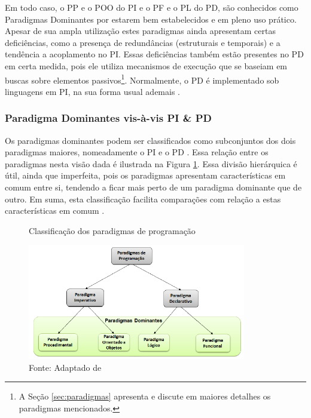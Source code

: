 
Em todo caso, o PP e o POO do PI e o PF e o PL do PD, são conhecidos como
Paradigmas Dominantes por estarem bem estabelecidos e em pleno uso prático.
Apesar de sua ampla utilização estes paradigmas ainda apresentam certas
deficiências, como a presença de redundâncias (estruturais e temporais) e a
tendência a acoplamento no PI. Essas deficiências também estão presentes no PD
em certa medida, pois ele utiliza mecanismos de execução que se baseiam em
buscas sobre elementos passivos\footnote{A Seção \ref{sec:paradigmas} apresenta
e discute em maiores detalhes os paradigmas mencionados.}. Normalmente, o PD é
implementado sob linguagens em PI, na sua forma usual ademais
\cite{msc_Banaszewski_2009,doc_ronszcka_2019}.

\subsubsection{Paradigma Dominantes vis-à-vis PI \& PD}


Os paradigmas dominantes podem ser classificados como subconjuntos dos dois
paradigmas maiores, nomeadamente o PI e o PD \cite{msc_Banaszewski_2009}. Essa
relação entre os paradigmas nesta visão dada é ilustrada na Figura
\ref{fig:classificacao}. Essa divisão hierárquica é útil, ainda que imperfeita,
pois os paradigmas apresentam características em comum entre si, tendendo a
ficar mais perto de um paradigma dominante que de outro. Em suma, esta
classificação facilita comparações com relação a estas características em comum
\cite{doc_ronszcka_2019}.

\begin{figure}[!htb]
  \centering
  \caption{Classificação dos paradigmas de programação}
  \includegraphics[width=0.85\textwidth]{../figures/classificacao_cut2.png}
  \caption*{Fonte: Adaptado de }
  \label{fig:classificacao}
\end{figure}


